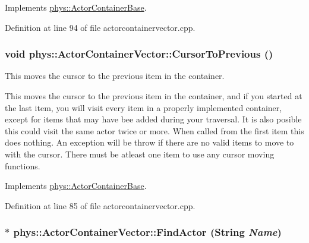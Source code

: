Implements \hyperlink{classphys_1_1ActorContainerBase_a1aa337456a4e74cb5740dbae08778072}{phys::ActorContainerBase}.



Definition at line 94 of file actorcontainervector.cpp.

\hypertarget{classphys_1_1ActorContainerVector_ac483bcdf348f55dc8b04a8805a002413}{
\subsubsection[{CursorToPrevious}]{\setlength{\rightskip}{0pt plus 5cm}void phys::ActorContainerVector::CursorToPrevious ()}}
\label{d3/d64/classphys_1_1ActorContainerVector_ac483bcdf348f55dc8b04a8805a002413}


This moves the cursor to the previous item in the container. 

This moves the cursor to the previous item in the container, and if you started at the last item, you will visit every item in a properly implemented container, except for items that may have bee added during your traversal. It is also posible this could visit the same actor twice or more. When called from the first item this does nothing. An exception will be throw if there are no valid items to move to with the cursor. There must be atleast one item to use any cursor moving functions. 

Implements \hyperlink{classphys_1_1ActorContainerBase_a7c424168c0bbd973b283a083714123b3}{phys::ActorContainerBase}.



Definition at line 85 of file actorcontainervector.cpp.

\hypertarget{classphys_1_1ActorContainerVector_ae04f8c6dd9b07ef9c1456707be9e155b}{
\subsubsection[{FindActor}]{ $\ast$ phys::ActorContainerVector::FindActor ({\bf String} {\em Name})}}
\label{d3/d64/classphys_1_1ActorContainerVector_ae04f8c6dd9b07ef9c1456707be9e155b}



